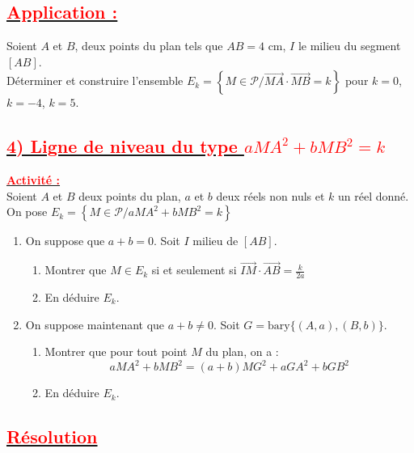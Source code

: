 \documentclass[12pt,a4paper]{article}
\newcounter{solution}
\begin{document}
\subsection*{\underline{\textbf{\textcolor{red}{Application :}}}}

Soient $A$ et $B$, deux points du plan tels que $AB = 4\text{ cm}$, $I$ le milieu du segment $[AB]$. \\
Déterminer et construire l'ensemble $E_k = \left\{ M \in \mathcal{P} \big/ \overrightarrow{MA} \cdot \overrightarrow{MB} = k \right\}$ pour $k = 0$, $k = -4$, $k = 5$.

\subsection*{\underline{\textbf{\textcolor{red}{4) Ligne de niveau du type $aMA^2 + bMB^2 = k$}}}}

\textbf{\underline{\textcolor{red}{Activité :}}} \\
Soient $A$ et $B$ deux points du plan, $a$ et $b$ deux réels non nuls et $k$ un réel donné. \\
On pose $E_k = \left\{ M \in \mathcal{P} \big/ aMA^2 + bMB^2 = k \right\}$

\begin{enumerate}
    \item On suppose que $a + b = 0$. Soit $I$ milieu de $[AB]$.
    \begin{enumerate}
        \item Montrer que $M \in E_k$ si et seulement si $\overrightarrow{IM} \cdot \overrightarrow{AB} = \frac{k}{2a}$
        \item En déduire $E_k$.
    \end{enumerate}

    \item On suppose maintenant que $a + b \neq 0$. Soit $G = \text{bary}\{(A, a), (B, b)\}$.
    \begin{enumerate}
        \item Montrer que pour tout point $M$ du plan, on a :
        \[
        aMA^2 + bMB^2 = (a+b)MG^2 + aGA^2 + bGB^2
        \]
        \item En déduire $E_k$.
    \end{enumerate}
\end{enumerate}

\subsection*{\underline{\textbf{\textcolor{red}{Résolution}}}}
\end{document}
